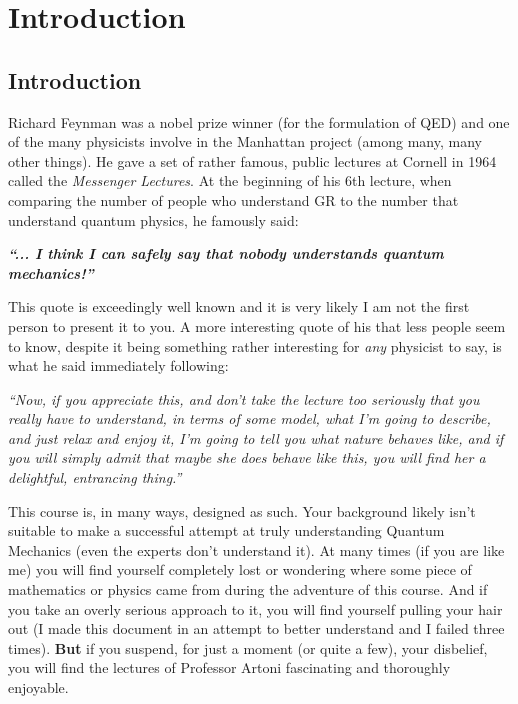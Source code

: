 \documentclass[../../Quantum-Technologies-Notes]{subfiles}
\begin{document}
	
	\ifSubfilesClassLoaded{ \pagestyle{fancy} }{}
	
	\section{Introduction}
	
		\subsection{Introduction}
		
			Richard Feynman was a nobel prize winner (for the formulation of QED) and one of the many physicists involve in the Manhattan project (among many, many other things). He gave a set of rather famous, public lectures at Cornell in 1964 called the \textit{Messenger Lectures}. At the beginning of his 6th lecture, when comparing the number of people who understand GR to the number that understand quantum physics, he famously said: \linebreak
				\begin{addmargin}{1cm}
					\textit{\textbf{``... I think I can safely say that nobody understands quantum mechanics!''}}
				\end{addmargin} 
				
			\vspace{1cm}
				
			This quote is exceedingly well known and it is very likely I am not the first person to present it to you. A more interesting quote of his that less people seem to know, despite it being something rather interesting for \textit{any} physicist to say, is what he said immediately following: \linebreak
			\begin{addmargin}{1cm}
				\textit{``Now, if you appreciate this, and don’t take the lecture too seriously that you really have to understand, in terms of some model, what I’m going to describe, and just relax and enjoy it, I’m going to tell you what nature behaves like, and if you will simply admit that maybe she does behave like this, you will find her a delightful, entrancing thing.''}
			\end{addmargin}
			
			\vspace{1cm}
			
			This course is, in many ways, designed as such. Your background likely isn't suitable to make a successful attempt at truly understanding Quantum Mechanics (even the experts don't understand it). At many times (if you are like me) you will find yourself completely lost or wondering where some piece of mathematics or physics came from during the adventure of this course. And if you take an overly serious approach to it, you will find yourself pulling your hair out (I made this document in an attempt to better understand and I failed three times). \linebreak
			\textbf{But} if you suspend, for just a moment (or quite a few), your disbelief, you will find the lectures of Professor Artoni fascinating and thoroughly enjoyable. \linebreak
			
\end{document}
